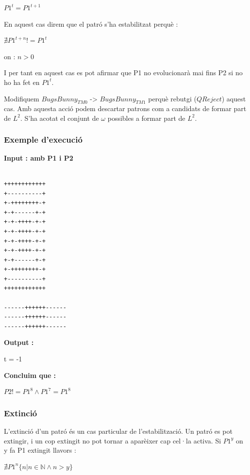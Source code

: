 \documentclass[12pt,a4paper]{report}
\def \w{$\omega$}
\def \tmz{$BugsBunny_{TM0} $}
\def \tmu{$BugsBunny_{TM1} $}
\def \ld{$L^{2}$}
\begin{document}
\begin{center}
$P1^t = P1^{t+1}$
\end{center}

En aquest cas direm que el patró s’ha estabilitzat perquè :

\begin{center}
$\nexists P1^{t+n} != P1^t$
\end{center}

on : $n > 0$

I per tant en aquest cas es pot afirmar que P1 no evolucionarà mai fins P2 si no ho ha fet en $P1^t$.

Modifiquem \tmz{} -> \tmu{} perquè rebutgi ($QReject$) aquest cas. Amb aquesta acció podem descartar patrons com a candidats de formar part de \ld{}. S’ha acotat el conjunt de \w{} possibles a formar part de \ld{}.

\subsubsection{Exemple d'execució}

\textbf{Input : amb P1 i P2}

\begin{lstlisting}

++++++++++++
+----------+
+-++++++++-+
+-+------+-+
+-+-++++-+-+
+-+-++++-+-+
+-+-++++-+-+
+-+-++++-+-+
+-+------+-+
+-++++++++-+
+----------+
++++++++++++

------++++++------
------++++++------
------++++++------

\end{lstlisting}

\textbf{Output :}

t = -1

\textbf{Concluim que :}

$P2 != P1^8 \wedge P1^7 = P1^8$

\subsubsection{Extinció}

L’extinció d’un patró és un cas particular de l’estabilització. Un patró es pot extingir, i un cop extingit no pot tornar a aparèixer cap cel·la activa. Si $P1^y$ on y fa P1 extingit llavors :

\begin{center}
$\nexists P1^n \{n | n \in \mathbb{N} \wedge n > y\}$
\end{center}
\end{document}
